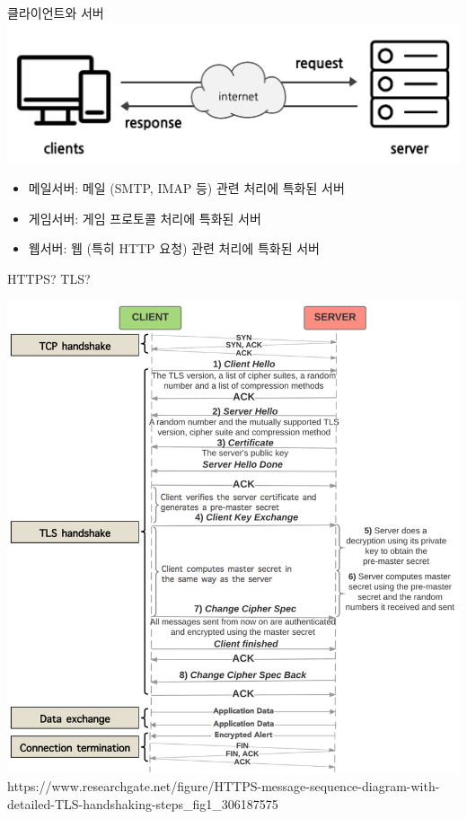\documentclass{beamer}
\begin{document}
    \begin{frame}{클라이언트와 서버}
        \includegraphics[width=\textwidth]{Images/server-client.jpg}
        \begin{itemize}
            \item 메일서버: 메일 (SMTP, IMAP 등) 관련 처리에 특화된 서버
            \item 게임서버: 게임 프로토콜 처리에 특화된 서버
            \item 웹서버: 웹 (특히 HTTP 요청) 관련 처리에 특화된 서버
        \end{itemize}
    \end{frame}

    \begin{frame}{HTTPS? TLS?}
        \begin{center}
            \includegraphics[height=0.7\textheight]{Images/https_seq.png}
            \tiny{\\https://www.researchgate.net/figure/HTTPS-message-sequence-diagram-with-detailed-TLS-handshaking-steps\_fig1\_306187575}
        \end{center}
    \end{frame}
\end{document}
